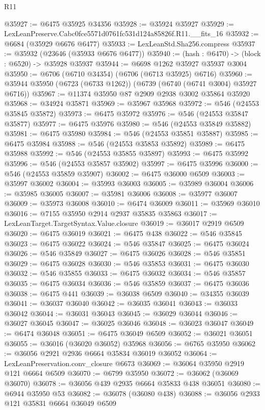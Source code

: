 \begin{lexlean}{R11}
\begin{coremodule}
@35927 := @6475 @35925 @34356
@35928 := @35924 @35927
@35929 := LexLeanPreserve.Cabc0fce5571d0761fc531d124a85826f.R11.__fits_16
@35932 := @6684 (@35929 @6676 @6477)
@35933 := LexLeanStd.Sha256.compress
@35937 := @35932 (@23646 (@35933 @6676 @6477))
@35940 := (hash : @6470) -> (block : @6520) -> @35928 @35937
@35944 := @6698 @1262 @35927 @35937 @3004
@35950 := @6706 (@6710 @34354) (@6706 (@6713 @35925) @6716)
@35960 := @35944 @35950 (@6723 (@6733 @1262)) (@6739 (@6740 (@6741 @3004) @35927 @6716))
@35967 := @11374 @35950 @87 @2909 @2938 @3002 @35864 @35920
@35968 := @34924 @35871
@35969 := @35967 @35968
@35972 := @546 (@24553 @35845 @35872)
@35973 := @6475 @35972
@35976 := @546 (@24553 @35847 @35877)
@35977 := @6475 @35976
@35980 := @546 (@24553 @35849 @35882)
@35981 := @6475 @35980
@35984 := @546 (@24553 @35851 @35887)
@35985 := @6475 @35984
@35988 := @546 (@24553 @35853 @35892)
@35989 := @6475 @35988
@35992 := @546 (@24553 @35855 @35897)
@35993 := @6475 @35992
@35996 := @546 (@24553 @35857 @35902)
@35997 := @6475 @35996
@36000 := @546 (@24553 @35859 @35907)
@36002 := @6475 @36000 @6509
@36003 := @35997 @36002
@36004 := @35993 @36003
@36005 := @35989 @36004
@36006 := @35985 @36005
@36007 := @35981 @36006
@36008 := @35977 @36007
@36009 := @35973 @36008
@36010 := @6474 @36009
@36011 := @35969 @36010
@36016 := @7155 @35950 @2914 @2937 @35835 @35863
@36017 := LexLeanTarget.TargetSyntax.Value.closure
@36019 := @36017 @2919 @6509
@36020 := @6475 @36019
@36021 := @6475 @438
@36022 := @546 @35845
@36023 := @6475 @36022
@36024 := @546 @35847
@36025 := @6475 @36024
@36026 := @546 @35849
@36027 := @6475 @36026
@36028 := @546 @35851
@36029 := @6475 @36028
@36030 := @546 @35853
@36031 := @6475 @36030
@36032 := @546 @35855
@36033 := @6475 @36032
@36034 := @546 @35857
@36035 := @6475 @36034
@36036 := @546 @35859
@36037 := @6475 @36036
@36038 := @6475 @441
@36039 := @36038 @6509
@36040 := @34355 @36039
@36041 := @36037 @36040
@36042 := @36035 @36041
@36043 := @36033 @36042
@36044 := @36031 @36043
@36045 := @36029 @36044
@36046 := @36027 @36045
@36047 := @36025 @36046
@36048 := @36023 @36047
@36049 := @6474 @36048
@36051 := @6475 @36049 @6509
@36052 := @36021 @36051
@36055 := @36016 (@36020 @36052) @35968
@36056 := @6765 @35950
@36062 := @36056 @2921 @2936 @6664 @35834 @36019 @36052
@36064 := LexLeanPreservation.conv_closure @6673
@36069 := @36064 @35950 @2919 @121 @6664 @6509
@36070 := @6799 @35950
@36072 := @36062 (@36069 @36070)
@36078 := @36056 @439 @2935 @6664 @35833 @438 @36051
@36080 := @6944 @35950 @53
@36082 := @36078 (@36080 @438)
@36088 := @36056 @2933 @121 @35831 @6664 @36049 @6509

\end{coremodule}
\end{lexlean}
